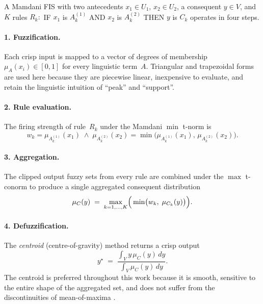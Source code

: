 \documentclass[conference]{IEEEtran}
\begin{document}
A Mamdani FIS with two antecedents
\(x_1\in U_1,\,x_2\in U_2\), a consequent \(y\in V\), and \(K\) rules
\(R_k:\) IF \(x_1\) is \(A_k^{(1)}\) AND \(x_2\) is \(A_k^{(2)}\) THEN
\(y\) is \(C_k\) operates in four steps.

\paragraph{1. Fuzzification.}  Each crisp input is mapped to a vector of
degrees of membership
\(\mu_{A}(x_i)\in[0,1]\) for every linguistic term~\(A\).  Triangular and
trapezoidal forms are used here because they are piecewise linear,
inexpensive to evaluate, and retain the linguistic intuition of ``peak''
and ``support''.

\paragraph{2. Rule evaluation.}  The firing strength of rule~\(R_k\) under
the Mamdani \(\min\) t-norm is
\begin{equation}
  w_k = \mu_{A_k^{(1)}}(x_1)\;\wedge\;\mu_{A_k^{(2)}}(x_2)
      = \min\bigl(\mu_{A_k^{(1)}}(x_1),\,\mu_{A_k^{(2)}}(x_2)\bigr).
  \label{eq:firing}
\end{equation}

\paragraph{3. Aggregation.}  The clipped output fuzzy sets from every
rule are combined under the \(\max\) t-conorm to produce a single
aggregated consequent distribution
\begin{equation}
  \mu_C(y) \;=\; \max_{k=1,\dots,K}\Bigl(\,\min\bigl(w_k,\;\mu_{C_k}(y)\bigr)\Bigr).
  \label{eq:agg}
\end{equation}

\paragraph{4. Defuzzification.}  The \emph{centroid} (centre-of-gravity)
method returns a crisp output
\begin{equation}
  y^\star \;=\; \frac{\displaystyle\int_V y\,\mu_C(y)\,dy}
                     {\displaystyle\int_V \mu_C(y)\,dy}.
  \label{eq:centroid}
\end{equation}
The centroid is preferred throughout this work because it is
smooth, sensitive to the entire shape of the aggregated set, and does not
suffer from the discontinuities of mean-of-maxima
\cite{ross2010fuzzy,pedrycz2007fuzzy}.
\end{document}

